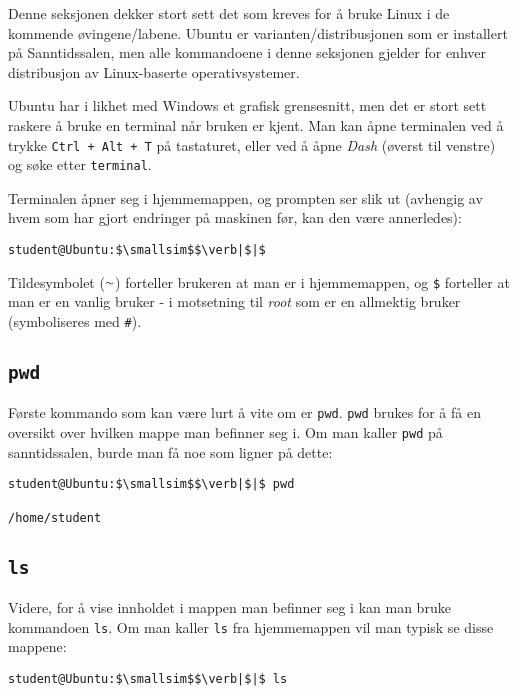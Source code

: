 \begin{alphasection}
Denne seksjonen dekker stort sett det som kreves for å bruke Linux i de kommende øvingene/labene. Ubuntu er varianten/distribusjonen som er installert på Sanntidssalen, men alle kommandoene i denne seksjonen gjelder for enhver distribusjon av Linux-baserte operativsystemer. 

Ubuntu har i likhet med Windows et grafisk grensesnitt, men det er stort sett raskere å bruke en terminal når bruken er kjent. Man kan åpne terminalen ved å trykke \verb|Ctrl + Alt + T| på tastaturet, eller ved å åpne \textit{Dash} (øverst til venstre) og søke etter \verb|terminal|. 

Terminalen åpner seg i hjemmemappen, og prompten ser slik ut (avhengig av hvem som har gjort endringer på maskinen før, kan den være annerledes):



\begin{lstlisting}[mathescape=true]
student@Ubuntu:$\smallsim$$\verb|$|$\end{lstlisting}

Tildesymbolet ($\smallsim$) forteller brukeren at man er i hjemmemappen, og \verb|$| forteller at man er en vanlig bruker - i motsetning til \textit{root} som er en allmektig bruker (symboliseres med \verb|#|).

\cprotect\subsection{\lstinline{pwd}}
Første kommando som kan være lurt å vite om er \verb|pwd|. \verb|pwd| brukes for å få en oversikt over hvilken mappe man befinner seg i. Om man kaller \verb|pwd| på sanntidssalen, burde man få noe som ligner på dette: 

\begin{lstlisting}[mathescape=true]
student@Ubuntu:$\smallsim$$\verb|$|$ pwd

/home/student
\end{lstlisting}



\cprotect\subsection{\lstinline{ls}}

Videre, for å vise innholdet i mappen man befinner seg i kan man bruke kommandoen \verb|ls|. Om man kaller \verb|ls| fra hjemmemappen vil man typisk se disse mappene:

\begin{lstlisting}[mathescape=true]
student@Ubuntu:$\smallsim$$\verb|$|$ ls


\end{lstlisting}
\end{alphasection}
